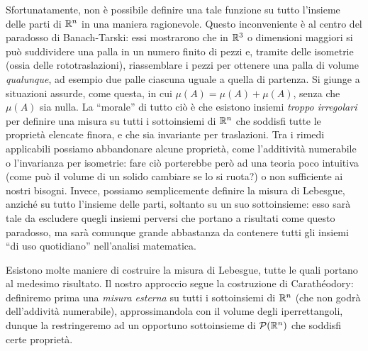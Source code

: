 Sfortunatamente, non è possibile definire una tale funzione su tutto l'insieme delle parti di $\mathbb{R}^n$ in una maniera ragionevole.
Questo inconveniente è al centro del paradosso di Banach-Tarski: essi mostrarono che in $\mathbb{R}^3$ o dimensioni maggiori si può suddividere una palla in un numero finito di pezzi e, tramite delle isometrie (ossia delle rototraslazioni), riassemblare i pezzi per ottenere una palla di volume \emph{qualunque}, ad esempio due palle ciascuna uguale a quella di partenza.
Si giunge a situazioni assurde, come questa, in cui $\mu(A)=\mu(A)+\mu(A)$, senza che $\mu(A)$ sia nulla.
La ``morale'' di tutto ciò è che esistono insiemi \emph{troppo irregolari} per definire una misura su tutti i sottoinsiemi di $\mathbb{R}^n$ che soddisfi tutte le proprietà elencate finora, e che sia invariante per traslazioni.
Tra i rimedi applicabili possiamo abbandonare alcune proprietà, come l'additività numerabile o l'invarianza per isometrie: fare ciò porterebbe però ad una teoria poco intuitiva (come può il volume di un solido cambiare se lo si ruota?) o non sufficiente ai nostri bisogni.
Invece, possiamo semplicemente definire la misura di Lebesgue, anzich\'e su tutto l'insieme delle parti, soltanto su un suo sottoinsieme: esso sarà tale da escludere quegli insiemi perversi che portano a risultati come questo paradosso, ma sarà comunque grande abbastanza da contenere tutti gli insiemi ``di uso quotidiano'' nell'analisi matematica.

Esistono molte maniere di costruire la misura di Lebesgue, tutte le quali portano al medesimo risultato.
Il nostro approccio segue la costruzione di Carath\'eodory: definiremo prima una \emph{misura esterna} su tutti i sottoinsiemi di $\mathbb{R}^n$ (che non godrà dell'addività numerabile), approssimandola con il volume degli iperrettangoli, dunque la restringeremo ad un opportuno sottoinsieme di $\mathcal P(\mathbb{R}^n)$ che soddisfi certe proprietà.

